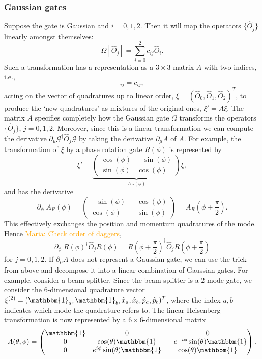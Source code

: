 \documentclass[aps,pra,10pt,twocolumn,groupedaddress,nofootinbib]{revtex4-1}
\theoremstyle{plain}
\newcommand{\x}{\hat{x}}
\newcommand{\p}{\hat{p}}
\newcommand{\maria}[1]{\textcolor{orange}{Maria: #1}}
\begin{document}
\subsubsection{Gaussian gates}
Suppose the gate is Gaussian and $i=0,1,2$. Then it will map the operators $\{\hat{O}_j\}$ linearly amongst themselves: 
\begin{equation}
 \Omega[\hat{O}_j] = \sum_{i=0}^2 c_{ij} \hat{O}_i.
\end{equation}
Such a transformation has a representation as a $3\times 3$ matrix $A$ with two indices, i.e., 
\begin{equation}
 [A]_{ij} = c_{ij},
\end{equation}
acting on the vector of quadratures up to linear order, $\xi = (\hat{O}_0, \hat{O}_1, \hat{O}_2)^T$, to produce the `new quadratures' as mixtures of the original ones, $\xi' = A \xi$. The matrix $A$ specifies completely how the Gaussian gate $\Omega$ transforms the operators $\{\hat{O}_j\}$, $j=0,1,2$. Moreover, since this is a linear transformation we can compute the derivative $\partial_{\mu} \mathcal{G}^\dagger \hat{O}_j \mathcal{G}$ by taking the derivative  $\partial_{\mu}A$ of $A$. For example, the transformation of $\xi$ by a phase rotation gate $R(\phi)$ is represented by 
\[
	\xi' =  \underbrace{\begin{pmatrix} \cos(\phi) & -\sin(\phi) \\
	\sin(\phi) & \cos(\phi) \end{pmatrix}}_{A_R(\phi)}\xi, 
\]
and has the derivative
\[ 
	\partial_{\phi} \; A_R(\phi) = \begin{pmatrix} -\sin(\phi) & -\cos(\phi) \\
	\cos(\phi) & -\sin(\phi) \end{pmatrix} = A_R(\phi+ \frac{\pi}{2}).
\]
This effectively exchanges the position and momentum quadratures of the mode. Hence \maria{Check order of daggers}, 
\[ 
	\partial_{\phi} \; R(\phi)^{\dagger} \hat{O}_j R(\phi) = R(\phi+ \frac{\pi}{2})^{\dagger} \hat{O}_j R(\phi+ \frac{\pi}{2})
\]
for $j = 0,1,2$. If $\partial_{\mu}A$ does not represent a Gaussian gate, we can use the trick from above and decompose it into a linear combination of Gaussian gates. For example, consider a beam splitter. Since the beam splitter is a $2$-mode gate, we consider the $6$-dimensional quadrature vector $\xi^{(2)} =(\mathbbm{1}_a, \mathbbm{1}_b, \x_a, \x_b, \p_a, \p_b )^T$, where the index $a, b$ indicates which mode the quadrature refers to. The linear Heisenberg transformation is now represented by a $6 \times 6$-dimensional matrix
\begin{equation} \label{eq:beamsplitter_as_matrix} 
A(\theta, \phi) = \begin{pmatrix} 
\mathbbm{1} & 0 & 0\\
0 & \cos(\theta) \mathbbm{1} & -e^{-i\phi}\sin(\theta) \mathbbm{1}\\
0 & e^{i\phi}\sin(\theta) \mathbbm{1} & \cos(\theta) \mathbbm{1} \end{pmatrix}.
\end{equation}
\end{document}
